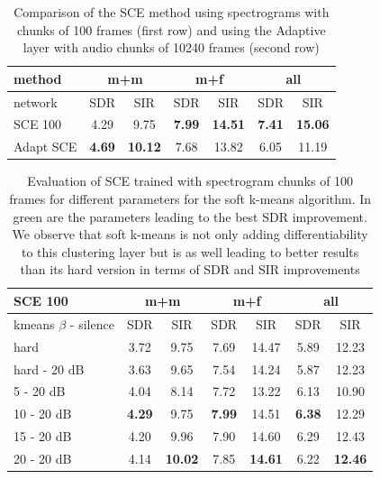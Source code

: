 \documentclass[master, tikz, final,11pt, dvipdfmx]{iscs-thesis}
\begin{document}
\begin{table}[h!]
\centering
\begin{tabular}{l|c|c|c|c|c|c}
method & \multicolumn{2}{c|}{m+m} & \multicolumn{2}{c|}{m+f} & \multicolumn{2}{c}{all} \\ 
\hline 
network & SDR & SIR & SDR & SIR & SDR & SIR \\ 
\hline 
SCE 100 & 4.29 & 9.75 & \textbf{7.99} & \textbf{14.51} & \textbf{7.41} & \textbf{15.06} \\ 
Adapt SCE & \textbf{4.69} & \textbf{10.12} & 7.68 & 13.82 & 6.05 & 11.19 \\ 
\end{tabular}
\caption[Comparison of the SCE method using spectrograms with chunks of 100 frames and using the Adaptive layer with audio chunks of 10240 frames]{Comparison of the SCE method using spectrograms with chunks of 100 frames (first row) and using the Adaptive layer with audio chunks of 10240 frames (second row)}
\label{table:SCE100softrecap}
\end{table}

\begin{table}[h!]
\centering
\begin{tabular}{l|c|c|c|c|c|c}
SCE 100 & \multicolumn{2}{c|}{m+m} & \multicolumn{2}{c|}{m+f} & \multicolumn{2}{c}{all} \\ 
\hline 
kmeans $\beta$ - silence & SDR & SIR & SDR & SIR & SDR & SIR \\ 
\hline 
hard & 3.72 & 9.75 & 7.69 & 14.47 & 5.89 & 12.23 \\ 
hard - 20 dB & 3.63 & 9.65 & 7.54 & 14.24 & 5.87 & 12.23 \\ 
\hline 
\hline 
5 - 20 dB & 4.04 & 8.14 & 7.72 & 13.22 & 6.13 & 10.90 \\ 
10 - 20 dB & \cellcolor{green}\textbf{4.29} & \cellcolor{green}9.75 & \cellcolor{green}\textbf{7.99} & \cellcolor{green}14.51 & \cellcolor{green}\textbf{6.38} & \cellcolor{green}12.29 \\ 
15 - 20 dB & 4.20 & 9.96 & 7.90 & 14.60 & 6.29 & 12.43 \\ 
20 - 20 dB & 4.14 & \textbf{10.02} & 7.85 & \textbf{14.61} & 6.22 & \textbf{12.46} \\ 
\end{tabular}
\caption[Evaluation of SCE trained with spectrogram chunks of size 100 on different parameters for k-means]{Evaluation of SCE trained with spectrogram chunks of 100 frames for different parameters for the soft k-means algorithm. In green are the parameters leading to the best SDR improvement. We observe that soft k-means is not only adding differentiability to this clustering layer but is as well leading to better results than its hard version in terms of SDR and SIR improvements}
\label{table:SCE100softkmeans}
\end{table}
\end{document}
